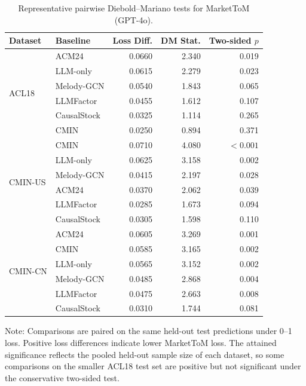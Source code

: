 \documentclass[a4paper,fleqn,doubleblind]{cas-sc}
\begin{document}
\begin{table}[htbp]
\centering
\small
\setlength{\tabcolsep}{4pt}
\renewcommand{\arraystretch}{0.88}
\caption{Representative pairwise Diebold--Mariano tests for MarketToM (GPT-4o).}
\begin{tabular}{llrrr}
\toprule
\textbf{Dataset} & \textbf{Baseline} & \textbf{Loss Diff.} & \textbf{DM Stat.} & \textbf{Two-sided $p$} \\
\midrule
\multirow{6}{*}{ACL18}
& ACM24 & 0.0660 & 2.340 & 0.019 \\
& LLM-only & 0.0615 & 2.279 & 0.023 \\
& Melody-GCN & 0.0540 & 1.843 & 0.065 \\
& LLMFactor & 0.0455 & 1.612 & 0.107 \\
& CausalStock & 0.0325 & 1.114 & 0.265 \\
& CMIN & 0.0250 & 0.894 & 0.371 \\
\midrule
\multirow{6}{*}{CMIN-US}
& CMIN & 0.0710 & 4.080 & $<0.001$ \\
& LLM-only & 0.0625 & 3.158 & 0.002 \\
& Melody-GCN & 0.0415 & 2.197 & 0.028 \\
& ACM24 & 0.0370 & 2.062 & 0.039 \\
& LLMFactor & 0.0285 & 1.673 & 0.094 \\
& CausalStock & 0.0305 & 1.598 & 0.110 \\
\midrule
\multirow{6}{*}{CMIN-CN}
& ACM24 & 0.0605 & 3.269 & 0.001 \\
& CMIN & 0.0585 & 3.165 & 0.002 \\
& LLM-only & 0.0565 & 3.152 & 0.002 \\
& Melody-GCN & 0.0485 & 2.868 & 0.004 \\
& LLMFactor & 0.0475 & 2.663 & 0.008 \\
& CausalStock & 0.0310 & 1.744 & 0.081 \\
\bottomrule
\end{tabular}
\begin{flushleft}
\footnotesize Note: Comparisons are paired on the same held-out test predictions under 0--1 loss. Positive loss differences indicate lower MarketToM loss. The attained significance reflects the pooled held-out sample size of each dataset, so some comparisons on the smaller ACL18 test set are positive but not significant under the conservative two-sided test.
\end{flushleft}
\label{tab:app_dm_pairwise_strong_baselines}
\end{table}
\end{document}
